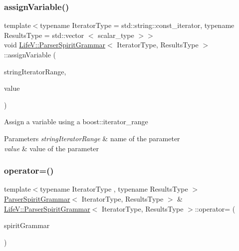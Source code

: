 \subsubsection{\texorpdfstring{assign\+Variable()}{assignVariable()}}
{\footnotesize\ttfamily template$<$typename Iterator\+Type = std\+::string\+::const\+\_\+iterator, typename Results\+Type = std\+::vector $<$ scalar\+\_\+type $>$$>$ \\
void \hyperlink{classLifeV_1_1ParserSpiritGrammar}{Life\+V\+::\+Parser\+Spirit\+Grammar}$<$ Iterator\+Type, Results\+Type $>$\+::assign\+Variable (\begin{DoxyParamCaption}\item[{const iterator\+Range\+\_\+\+Type \&}]{string\+Iterator\+Range,  }\item[{const scalar\+\_\+type \&}]{value }\end{DoxyParamCaption})\hspace{0.3cm}{\ttfamily [inline]}}

Assign a variable using a {\ttfamily boost\+::iterator\+\_\+range} 


\begin{DoxyParams}{Parameters}
{\em string\+Iterator\+Range} & name of the parameter \\
\hline
{\em value} & value of the parameter \\
\hline
\end{DoxyParams}
\mbox{\label{classLifeV_1_1ParserSpiritGrammar_a6ce4fa32aacdc3bc7e4b38be901f94cf}} 
\subsubsection{\texorpdfstring{operator=()}{operator=()}}
{\footnotesize\ttfamily template$<$typename Iterator\+Type , typename Results\+Type $>$ \\
\hyperlink{classLifeV_1_1ParserSpiritGrammar}{Parser\+Spirit\+Grammar}$<$ Iterator\+Type, Results\+Type $>$ \& \hyperlink{classLifeV_1_1ParserSpiritGrammar}{Life\+V\+::\+Parser\+Spirit\+Grammar}$<$ Iterator\+Type, Results\+Type $>$\+::operator= (\begin{DoxyParamCaption}\item[{const \hyperlink{classLifeV_1_1ParserSpiritGrammar}{Parser\+Spirit\+Grammar}$<$ Iterator\+Type, Results\+Type $>$ \&}]{spirit\+Grammar }\end{DoxyParamCaption})}



